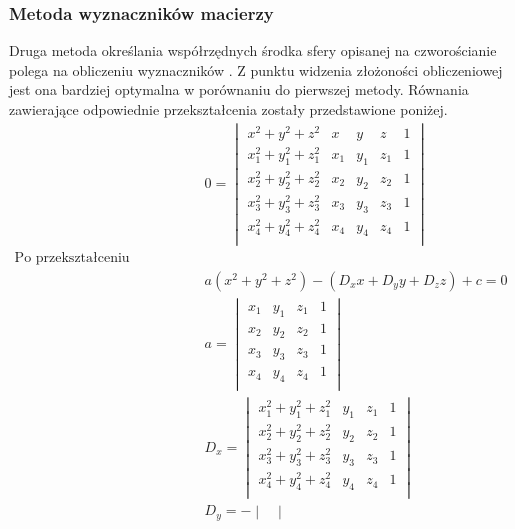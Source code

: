 \subsubsection{Metoda wyznaczników macierzy}
Druga metoda określania współrzędnych środka sfery opisanej na czworościanie polega na obliczeniu wyznaczników \cite{CircumTetraWolf}. Z punktu widzenia złożoności obliczeniowej jest ona bardziej optymalna w porównaniu do pierwszej metody. Równania zawierające odpowiednie przekształcenia zostały przedstawione poniżej.
\begin{equation}
    \begin{aligned}
            &0=\begin{vmatrix}
                x^2+y^2+z^2 & x&y&z&1 \\
                x_{1}^2+y_{1}^2+z_{1}^2 & x_{1}&y_{1}&z_{1}&1 \\
                x_{2}^2+y_{2}^2+z_{2}^2 & x_{2}&y_{2}&z_{2}&1 \\
                x_{3}^2+y_{3}^2+z_{3}^2 & x_{3}&y_{3}&z_{3}&1 \\
                x_{4}^2+y_{4}^2+z_{4}^2 & x_{4}&y_{4}&z_{4}&1 \\
            \end{vmatrix}\\
            \text{Po przekształceniu wyznacznika}\\
            &a(x^2+y^2+z^2)-(D_{x}x+D_{y}y+D_{z}z)+c=0\\
            &a=\begin{vmatrix}
               x_{1}&y_{1}&z_{1}&1 \\
                x_{2}&y_{2}&z_{2}&1 \\
                x_{3}&y_{3}&z_{3}&1 \\
                x_{4}&y_{4}&z_{4}&1 \\
            \end{vmatrix}\\
            &D_{x}=\begin{vmatrix}
                x_{1}^2+y_{1}^2+z_{1}^2 &y_{1}&z_{1}&1 \\
                x_{2}^2+y_{2}^2+z_{2}^2 & y_{2}&z_{2}&1 \\
                x_{3}^2+y_{3}^2+z_{3}^2 &y_{3}&z_{3}&1 \\
                x_{4}^2+y_{4}^2+z_{4}^2 &y_{4}&z_{4}&1 \\
            \end{vmatrix}\\
            &D_{y}=-\begin{vmatrix}

\end{vmatrix}
\end{aligned}
\end{equation}
